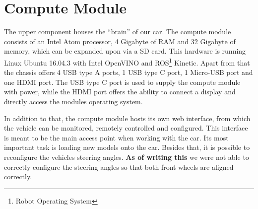 \section{Compute Module}
The upper component houses the ``brain'' of our car. The compute module consists of an Intel Atom
processor, 4 Gigabyte of RAM and 32 Gigabyte of memory, which can be expanded upon via a SD card. This hardware is running Linux Ubuntu 16.04.3 with Intel OpenVINO\texttrademark{} and ROS\footnote{Robot Operating System} Kinetic. Apart from that the chassis offers 4 USB type A ports, 1 USB type C port, 1 Micro-USB port and one HDMI port. The USB type C port is used to supply the compute module with power, while the HDMI port offers the ability to connect a display and directly access the modules operating system.

In addition to that, the compute module hosts its own web interface, from which the vehicle can be monitored, remotely controlled and configured. This interface is meant to be the main access point when working with the car. Its most important task is loading new models onto the car. Besides that, it is possible to reconfigure the vehicles steering angles. \textbf{As of writing this} we were not able to correctly configure the steering angles so that both front wheels are aligned correctly.
